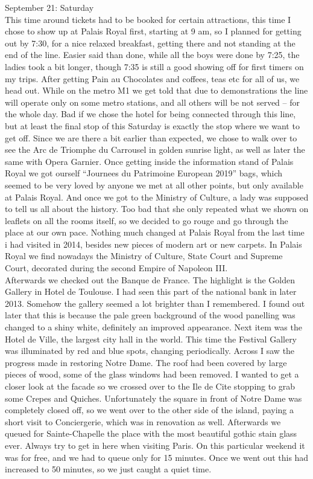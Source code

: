 September 21: Saturday\\
This time around tickets had to be booked for certain attractions, this time I chose to show up at Palais Royal first, starting at 9 am, so I planned for getting out by 7:30, for a nice relaxed breakfast, getting there and not standing at the end of the line. Easier said than done, while all the boys were done by 7:25, the ladies took a bit longer, though 7:35 is still a good showing off for first timers on my trips. After getting Pain au Chocolates and coffees, teas etc for all of us, we head out. While on the metro M1 we get told that due to demonstrations the line will operate only on some metro stations, and all others will be not served -- for the whole day. Bad if we chose the hotel for being connected through this line, but at least the final stop of this Saturday is exactly the stop where we want to get off. Since we are there a bit earlier than expected, we chose to walk over to see the Arc de Triomphe du Carrousel in golden sunrise light, as well as later the same with Opera Garnier. Once getting inside the information stand of Palais Royal we got ourself ``Journees du Patrimoine European 2019'' bags, which seemed to be very loved by anyone we met at all other points, but only available at Palais Royal. And once we got to the Ministry of Culture, a lady was supposed to tell us all about the history. Too bad that she only repeated what we shown on leaflets on all the rooms itself, so we decided to go rouge and go through the place at our own pace. Nothing much changed at Palais Royal from the last time i had visited in 2014, besides new pieces of modern art or new carpets. In Palais Royal we find nowadays the Ministry of Culture, State Court and Supreme Court, decorated during the second Empire of Napoleon III. \\
Afterwards we checked out the Banque de France. The highlight is the Golden Gallery in Hotel de Toulouse. I had seen this part of the national bank in later 2013. Somehow the gallery seemed a lot brighter than I remembered. I found out later that this is because the pale green background of the wood panelling was changed to a shiny white, definitely an improved appearance. Next item was the Hotel de Ville, the largest city hall in the world. This time the Festival Gallery was illuminated by red and blue spots, changing periodically. Across I saw the progress made in restoring Notre Dame. The roof had been covered by large pieces of wood, some of the glass windows had been removed. I wanted to get a closer look at the facade so we crossed over to the Ile de Cite stopping to grab some Crepes and Quiches. Unfortunately the square in front of Notre Dame was completely closed off, so we went over to the other side of the island, paying a short visit to Conciergerie, which was in renovation as well. Afterwards we queued for Sainte-Chapelle the place with the most beautiful gothic stain glass ever. Always try to get in here when visiting Paris. On this particular weekend it was for free, and we had to queue only for 15 minutes. Once we went out this had increased to 50 minutes, so we just caught a quiet time. \\
